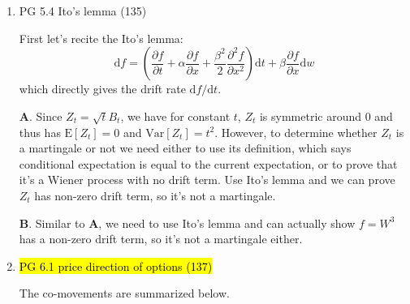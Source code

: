\documentclass[11pt]{article}
\newcommand{\E}{\text{E}}
\newcommand{\Var}{\text{Var}}
\renewcommand{\P}{\text{P}}
\renewcommand{\d}{\text{d}}
\newenvironment{note}{\begin{enumerate}[leftmargin=1em,topsep=0pt,noitemsep]}{\end{enumerate}}
\newcommand{\solution}{\boxed{\textbf{SOLUTION}}\hspace{.5em}}
\begin{document}
\begin{spacing}{1.1}
\begin{note}
\textbf{C}. Assume the probability of hitting $3$ first is $\P_3$, then since $B_T$ is a martingale for $T$ being the first passage time, we know $3\P_3 + (-5)(1- \P_3)=0$ which gives $\P_3 = 5/8$. Generally, we have $\P_{\alpha}=\alpha/(\alpha + \beta)$. For $B_t=W_t+mt$, since $\exp(\lambda W_t + \lambda^2t/2)$ is a martingale (see exponential martingale), we know $X_t = \exp(\lambda B_t + \lambda^2t/2)$ is also a martingale and thus $\E[X_t]=0$. Notice this holds for any $\lambda$ and thus we can let $\lambda = -2m$, which gives $\E[X_t] = \E[\exp(-2mB_t)]=1$. We know a martingale stopped at the stopping time is also a martingale, i.e. $X_T$ is still a martingale for $T$ being the time first $B_t$ hits $3$ or $-5$, so $\E[X_T] = \E[\exp(-2mB_T)]=\P_3\exp(-2m\cdot 3) + (1-\P_3)\exp(2m\cdot 5) = \P_3\exp(-6m)+(1-\P_3)\exp(10m)=1$. Therefore, we have $\P_3 = \frac{\exp(10m)-1}{\exp(10m)-\exp(-6m)}$.

\textbf{D}. Again we have $\E[\exp(-2mB_t)]=1$ while here we have $m=1$, and thus $\E[\exp(-2B_t)]=\P_{-1}\exp(2) + (1-\P_{-1})\exp(-\infty)=\exp(2)\P_{-2}=1$. So $\P_{-1}=\exp(-2)$.

\item PG 5.4 Ito's lemma (135) 

\solution First let's recite the Ito's lemma:
$$
\d f = \left(\frac{\partial f}{\partial t} + \alpha \frac{\partial f}{\partial x} + \frac{\beta^2}{2}\frac{\partial^2 f}{\partial x^2}\right)\d t + \beta \frac{\partial f}{\partial x}\d w
$$
which directly gives the drift rate $\d f / \d t$.

\textbf{A}. Since $Z_t  = \sqrt{t}B_t$, we have for constant $t$, $Z_t$ is symmetric around $0$ and thus has $\E[Z_t]=0$ and $\Var[Z_t]=t^2$. However, to determine whether $Z_t$ is a martingale or not we need either to use its definition, which says conditional expectation is equal to the current expectation, or to prove that it's a Wiener process with no drift term. Use Ito's lemma and we can prove $Z_t$ has non-zero drift term, so it's not a martingale.

\textbf{B}. Similar to $\textbf{A}$, we need to use Ito's lemma and can actually show $f=W^3$ has a non-zero drift term, so it's not a martingale either.

\item \hl{PG 6.1 price direction of options (137)}

\solution The co-movements are summarized below.


\end{note}
\end{spacing}
\end{document}
